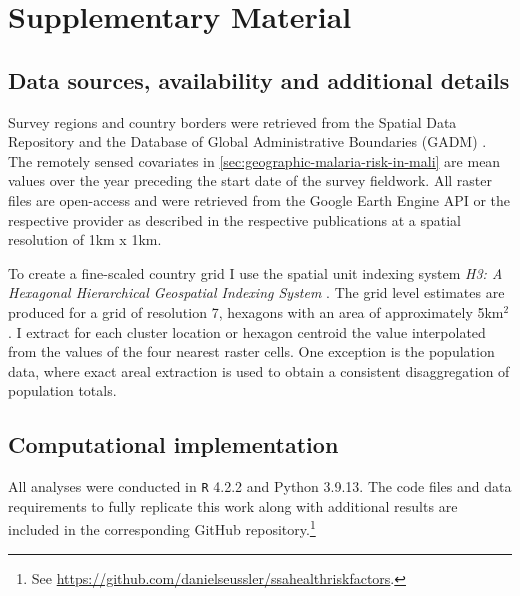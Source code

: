 \appendix
{}


\section{Supplementary Material}\label{sec:supplementary-material}

\subsection{Data sources, availability and additional details}\label{sec:data-sources-availability-and-additional-details}

Survey regions and country borders were retrieved from the Spatial Data Repository \autocite{icfinternationalSpatialDataRepository2022} and the Database of Global Administrative Boundaries (GADM) \autocite{globaladministrativeareasGADMDatabaseGlobal2022}. The remotely sensed covariates in \autoref{sec:geographic-malaria-risk-in-mali} are mean values over the year preceding the start date of the survey fieldwork. All raster files are open-access and were retrieved from the Google Earth Engine API \autocite{gorelickGoogleEarthEngine2017} or the respective provider as described in the respective publications at a spatial resolution of 1km x 1km. 

To create a fine-scaled country grid I use the spatial unit indexing system \textit{H3: A Hexagonal Hierarchical Geospatial Indexing System} \autocite{ubertechnologiesH3HexagonalHierarchical2022}. The grid level estimates are produced for a grid of resolution 7, hexagons with an area of approximately 5km$^2$. I extract for each cluster location or hexagon centroid the value interpolated from the values of the four nearest raster cells. One exception is the population data, where exact areal extraction is used to obtain a consistent disaggregation of population totals. 


\subsection{Computational implementation}\label{sec:computational-implementation}

All analyses were conducted in {\tt R} 4.2.2 \autocite{rcoreteamLanguageEnvironmentStatistical2022} and Python 3.9.13. The code files and data requirements to fully replicate this work along with additional results are included in the corresponding GitHub repository.\footnote{See \url{https://github.com/danielseussler/ssahealthriskfactors}.}

